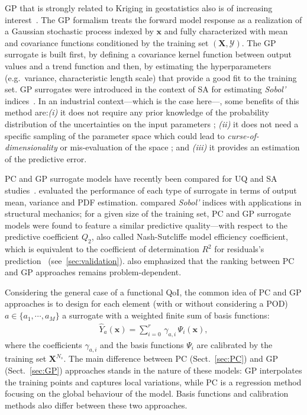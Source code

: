 GP that is strongly related to Kriging in geostatistics also is of increasing interest~\citep{rasmussen2006,legratiet2017,lockwood2012,marrel2015}. The GP formalism treats the forward model response as a realization of a Gaussian stochastic process indexed by $\mathbf{x}$ and fully characterized with mean and covariance functions conditioned by the training set $(\mathbf{X}, \mathcal{Y})$. The GP surrogate is built first, by defining a covariance kernel function between output values and a trend function and then, by estimating the hyperparameters (e.g.~variance, characteristic length scale) that provide a good fit to the training set. GP surrogates were introduced in the context of SA for estimating \emph{Sobol'} indices~\citep{oakley2004,marrel2009,legratiet2014}. In an industrial context---which is the case here---, some benefits of this method are:\textit{(i)} it does not require any prior knowledge of the probability distribution of the uncertainties on the input parameters ; \textit{(ii)} it does not need a specific sampling of the parameter space which could lead to \textit{curse-of-dimensionality} or mis-evaluation of the space ; and \textit{(iii)} it provides an estimation of the predictive error.

PC and GP surrogate models have recently been compared for UQ and SA studies~\citep{legratiet2017,owen2015,Schoebi2015}. \citet{owen2015} evaluated the performance of each type of surrogate in terms of output mean, variance and PDF estimation. \citet{legratiet2017} compared \emph{Sobol'} indices with applications in structural mechanics; for a given size of the training set, PC and GP surrogate models were found to feature a similar predictive quality---with respect to the predictive coefficient $Q_2$, also called Nash-Sutcliffe model efficiency coefficient, which is equivalent to the coefficient of determination $R^2$ for residuals's prediction~\citep{krause2005} (see~\cref{sec:validation}). \citet{legratiet2017} also emphasized that the ranking between PC and GP approaches remains problem-dependent.

Considering the general case of a functional QoI, the common idea of PC and GP approaches is to design for each element (with or without considering a POD) $a \in \{a_1, \cdots, a_M\}$ a surrogate with a weighted finite sum of basis functions:
\begin{align}
\widehat{Y}_a\left(\mathbf{x}\right) = \displaystyle\sum_{i = 0}^{r}\,\gamma_{a,i}\,\Psi_{i}\left(\mathbf{x}\right),
\label{eq:SurrogateForm}
\end{align}
where the coefficients $\gamma_{a,i}$ and the basis functions $\Psi_i$ are calibrated by the training set $\mathbf{X}^{N_s}$. The main difference between PC (Sect.~\ref{sec:PC}) and GP (Sect.~\ref{sec:GP}) approaches stands in the nature of these models: GP interpolates the training points and captures local variations, while PC is a regression method focusing on the global behaviour of the model. Basis functions and calibration methods also differ between these two approaches.

